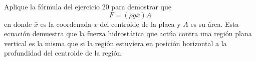 \item Aplique la fórmula del ejercicio 20 para demostrar que
    \[ F = (\rho g \bar{x}) A \]
    en donde $\bar{x}$ es la coordenada $x$ del centroide de la placa y $A$ es su área. Esta ecuación demuestra que la fuerza hidrostática que actúa contra una región plana vertical es la misma que si la región estuviera en posición horizontal a la profundidad del centroide de la región.
